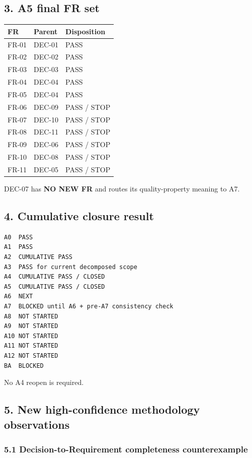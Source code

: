 \documentclass[11pt,a4paper]{article}
\begin{document}
\subsection{3. A5 final FR set}\label{3-a5-final-fr-set}

\begin{longtable}[]{@{}lll@{}}
\toprule\noalign{}
FR & Parent & Disposition \\
\midrule\noalign{}
\endhead
\bottomrule\noalign{}
\endlastfoot
FR-01 & DEC-01 & PASS \\
FR-02 & DEC-02 & PASS \\
FR-03 & DEC-03 & PASS \\
FR-04 & DEC-04 & PASS \\
FR-05 & DEC-04 & PASS \\
FR-06 & DEC-09 & PASS / STOP \\
FR-07 & DEC-10 & PASS / STOP \\
FR-08 & DEC-11 & PASS / STOP \\
FR-09 & DEC-06 & PASS / STOP \\
FR-10 & DEC-08 & PASS / STOP \\
FR-11 & DEC-05 & PASS / STOP \\
\end{longtable}

DEC-07 has \textbf{NO NEW FR} and routes its quality-property meaning to
A7.

\subsection{4. Cumulative closure
result}\label{4-cumulative-closure-result}

\begin{verbatim}
A0  PASS
A1  PASS
A2  CUMULATIVE PASS
A3  PASS for current decomposed scope
A4  CUMULATIVE PASS / CLOSED
A5  CUMULATIVE PASS / CLOSED
A6  NEXT
A7  BLOCKED until A6 + pre-A7 consistency check
A8  NOT STARTED
A9  NOT STARTED
A10 NOT STARTED
A11 NOT STARTED
A12 NOT STARTED
BA  BLOCKED
\end{verbatim}

No A4 reopen is required.

\subsection{5. New high-confidence methodology
observations}\label{5-new-high-confidence-methodology-observations}

\subsubsection{5.1 Decision-to-Requirement completeness
counterexample}\label{51-decision-to-requirement-completeness-counterexample}
\end{document}
